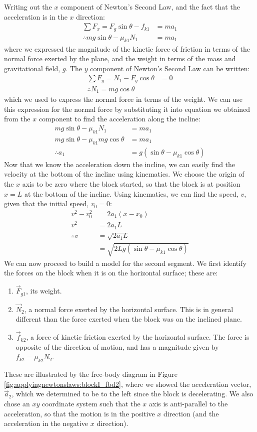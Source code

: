 \begin{example}
Writing out the $x$ component of Newton's Second Law, and the fact that the acceleration is in the $x$ direction:
\begin{align*}
\sum F_x = F_g\sin\theta - f_{k1} &= ma_1\\
\therefore mg\sin\theta - \mu_{k1} N_1 &= ma_1
\end{align*}
where we expressed the magnitude of the kinetic force of friction in terms of the normal force exerted by the plane, and the weight in terms of the mass and gravitational field, $g$. The $y$ component of Newton's Second Law can be written:
\begin{align*}
\sum F_y = N_1-F_g\cos\theta &= 0\\
\therefore N_1 = mg\cos\theta
\end{align*}
which we used to express the normal force in terms of the weight. We can use this expression for the normal force by substituting it into equation we obtained from the $x$ component to find the acceleration along the incline:
\begin{align*}
mg\sin\theta - \mu_{k1} N_1 &= ma_1\\
mg\sin\theta - \mu_{k1} mg\cos\theta&= ma_1\\
\therefore a_1 &= g(\sin\theta-\mu_{k1}\cos\theta)
\end{align*}
Now that we know the acceleration down the incline, we can easily find the velocity at the bottom of the incline using kinematics. We choose the origin of the $x$ axis to be zero where the block started, so that the block is at position $x=L$ at the bottom of the incline. Using kinematics, we can find the speed, $v$, given that the initial speed, $v_0=0$:
\begin{align*}
v^2-v_0^2&=2a_1(x-x_0)\\
v^2&=2a_1L\\
\therefore v &= \sqrt{2a_1L}\\
&=\sqrt{2Lg(\sin\theta-\mu_{k1}\cos\theta)}
\end{align*}
We can now proceed to build a model for the second segment. We first identify the forces on the block when it is on the horizontal surface; these are:
\begin{enumerate}
\item $\vec F_{g1}$, its weight.
\item $\vec N_2$, a normal force exerted by the horizontal surface. This is in general different than the force exerted when the block was on the inclined plane. 
\item $\vec f_{k2}$, a force of kinetic friction exerted by the horizontal surface. The force is opposite of the direction of motion, and has a magnitude given by $f_{k2}=\mu_{k2}N_2$.
\end{enumerate}
These are illustrated by the free-body diagram in Figure \ref{fig:applyingnewtonslaws:blockI_fbd2}, where we showed the acceleration vector, $\vec a_2$, which we determined to be to the left since the block is decelerating. We also chose an $xy$ coordinate system such that the $x$ axis is anti-parallel to the acceleration, so that the motion is in the positive $x$ direction (and the acceleration in the negative $x$ direction).


\end{example}
